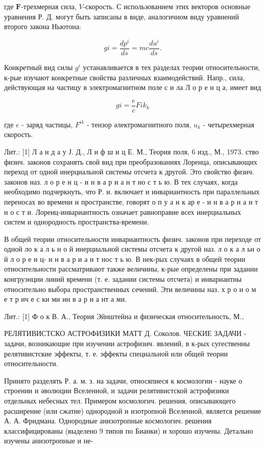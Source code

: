 \documentclass[10pt]{article}
\begin{document}
где $\boldsymbol{F}$-трехмерная сила, $V$-скорость. С использованием этих векторов основные уравнения Р. Д. могут быть записаны в виде, аналогичном виду уравнений второго закона Ньютона:



\[

g i=\frac{d p^{i}}{d s}=m c \frac{d u^{i}}{d s} .

\]



Конкретный вид силы $g^{i}$ устанавливается в тех разделах теории относительности, к-рые изучают конкретные свойства различных взаимодействий. Напр., сила, действующая на частицу в электромагнитном поле с и ла Л о р е н ц а, имеет вид



\[

g i=\frac{e}{c} F i k_{k}

\]



где $e$ - заряд частицы, $F^{i k}$ - тензор әлектромагнитного поля, $u_{k}$ - четырехмерная скорость.



Лит.: [1] Л а н д а у Ј. Д., Л и ф ш и ц Е. М., Теория поля, 6 изд., М., 1973. ство физич. законов сохранять свой вид при преобразованиях Лоренца, описывающих переход от одной инерциальной системы отсчета к другой. Это свойство физич. законов наз. л о р е н ц - и н в а р и а н т но с т ь ю. В тех случаях, когда необходимо подчеркнуть, что Р. и. включает и инвариантность при параллельных переносах во времени и пространстве, говорят о п у а н к ар е - и н в а р и а н т н о с т и. Лоренц-инвариантность означает равноправие всех инерциальных систем и однородность пространства-времени.



В общей теории относительности инвариантность физич. законов при переходе от одной ло к а л ь н о й инерциальной системы отсчета к другой наз. л о к а л ьн о й л о р е н ц- и н в а р и а н т нос т ь ю. В нек-рых случаях в общей теории относительности рассматривают также величины, к-рые определены при задании конгруэнции линий времени (т. е. задании системы отсчета) и инвариантны относительно выбора пространственных сечений. Эти величины наз. х р о н о м е т р ич е с ки ми ин в а р и а нт а ми.



Лит.: [1] Ф о к В. А., Теория Эйнштейна и физическая относительность, М.,

РЕЛЯТИВИСТСКО АСТРОФИЗИКИ МАТТ Д. Соколов. ЧЕСКИЕ ЗАДАЧИ - задачи, возникающие при изучении астрофизич. явлений, в к-рых сугественны релятивистские эффекты, т. е. эффекты специальной или общей теории относительности.



Принято разделять Р. а. м. з. на задачи, относяпиеся к космологии - науке о строении и әволюции Вселенной, и задачи релятивистской астрофизики отдельных небесных тел. Примером космологич. решения, описывающего расширение (или сжатие) однородной и изотропной Вселенной, является решение А. А. Фридмана. Однородные анизотропные космологич. решения классифицированы (выделено 9 типов по Бианки) и хорошо изучены. Детально изучены анизотропные и не-
\end{document}
